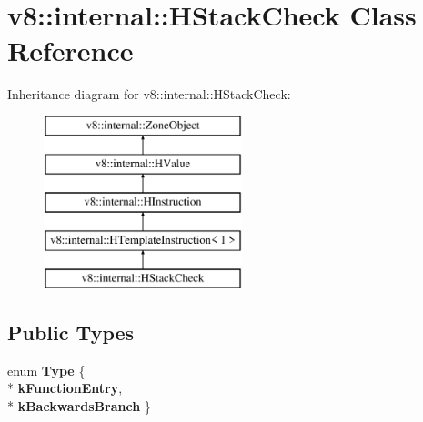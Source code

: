 \hypertarget{classv8_1_1internal_1_1_h_stack_check}{}\section{v8\+:\+:internal\+:\+:H\+Stack\+Check Class Reference}
\label{classv8_1_1internal_1_1_h_stack_check}
Inheritance diagram for v8\+:\+:internal\+:\+:H\+Stack\+Check\+:\begin{figure}[H]
\begin{center}
\leavevmode
\includegraphics[height=5.000000cm]{classv8_1_1internal_1_1_h_stack_check}
\end{center}
\end{figure}
\subsection*{Public Types}
\begin{DoxyCompactItemize}
\item 
enum {\bfseries Type} \{ \\*
{\bfseries k\+Function\+Entry}, 
\\*
{\bfseries k\+Backwards\+Branch}
 \}\hypertarget{classv8_1_1internal_1_1_h_stack_check_a646c27ff6104f0d89766f579d9a134c3}{}\label{classv8_1_1internal_1_1_h_stack_check_a646c27ff6104f0d89766f579d9a134c3}

\end{DoxyCompactItemize}
